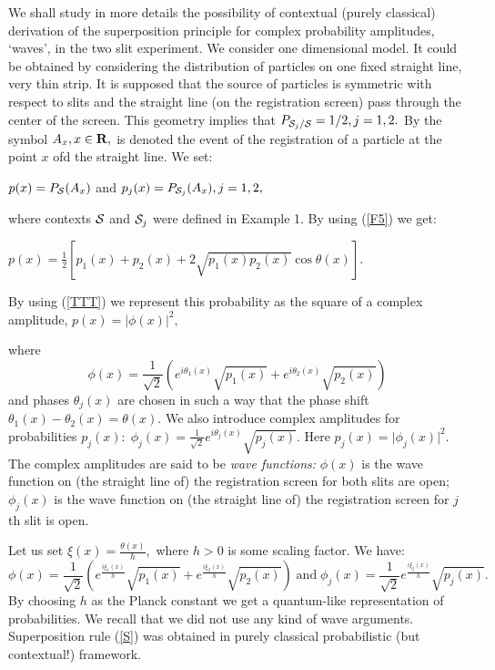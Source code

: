 \documentclass[12pt,oneside,final,a4paper]{article}
\begin{document}
We shall study in more details the possibility of
contextual (purely classical) derivation of the superposition
principle for complex probability amplitudes, `waves', 
in the two slit experiment. We consider one dimensional
model. It could be obtained by considering the distribution of 
particles on one fixed straight line, very thin strip. It is supposed
that the source of particles is symmetric with respect to slits and 
the straight line (on the registration screen) pass through the center
of the screen. This geometry implies that 
$P_{{\cal S}_j/{\cal S}} =1/2, j=1,2.$ By the symbol $A_x, x \in {\bf R},$
is denoted the event of  the registration of a particle at the point $x$ 
ofd the straight line. We set:

$ p(x)= P_{{\cal S}}(A_x)$ and $p_j(x)= P_{{\cal S}_j}(A_x), j=1,2,$

where contexts ${\cal S}$ and ${\cal S}_j$ were defined in Example 1.
By using
(\ref{F5}) we get:

$p(x)= \frac{1}{2} [p_1(x)+p_2(x)+ 2 \sqrt{p_1(x)p_2(x)} \cos \theta(x)] .$

By using (\ref{TTT}) we represent this probability as the square of a complex
amplitude, $p(x)= \vert \phi(x)\vert^2,$

where 
\begin{equation}
\label{S}
\phi(x)= \frac{1}{\sqrt{2}} (e^{i \theta_1(x)}\sqrt{p_1(x)} + 
e^{i \theta_2(x)}\sqrt{p_2(x)})
\end{equation}
and phases $\theta_j(x)$ are chosen in such a way that the phase shift
$\theta_1(x) - \theta_2(x) = \theta (x).$ We also introduce  complex amplitudes
for probabilities $p_j(x): \; \phi_j(x)= \frac{1}{\sqrt{2}} e^{i \theta_j(x)}\sqrt{p_j(x)}.$
Here $p_j(x)= \vert \phi_j(x)\vert^2.$ The complex amplitudes are 
said to be {\it wave functions:}  $\phi(x)$ is the wave function on (the straight
line of) the registration screen for both slits are open;
$\phi_j(x)$ is the wave function on (the straight
line of) the registration screen for $j$th slit  is open.

Let us set $\xi(x)=\frac{\theta(x)}{h},$ where $h>0$ is some scaling factor.
We have:
$$
\phi(x)= \frac{1}{\sqrt{2}} (e^{\frac{i \xi_1(x)}{h}}\sqrt{p_1(x)} + 
e^{\frac{i \xi_2(x)}{h}}\sqrt{p_2(x)})\; \mbox{and}\; 
\phi_j(x)= \frac{1}{\sqrt{2}} e^{\frac{i \xi_j(x)}{h}}\sqrt{p_j(x)}.
$$
By choosing $h$ as the Planck constant we get a quantum-like representation
of probabilities. We recall that we did not use any kind of wave arguments.
Superposition rule (\ref{S}) was obtained in purely classical probabilistic
(but contextual!) framework.
\end{document}
